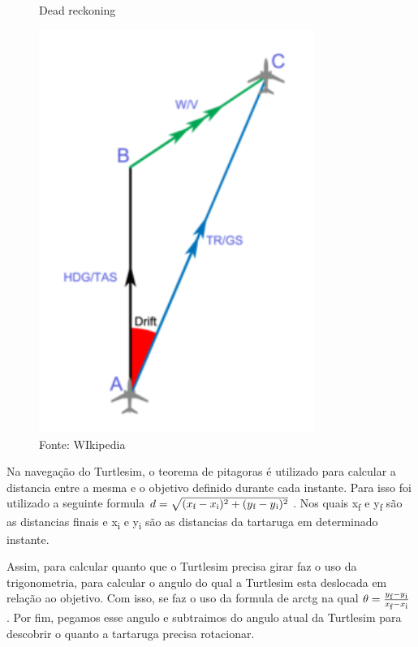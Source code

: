 \begin{figure}[h!]
    \centering
    \caption{Dead reckoning}
    \includegraphics[width=0.8\textwidth]{Figures/dead_reck.png}
    \caption*{Fonte: WIkipedia}
    \label{fig:Dead reckoning}
\end{figure}

Na navegação do Turtlesim, o teorema de pitagoras é utilizado para calcular
a distancia entre a mesma e o objetivo definido durante cada instante. Para 
isso foi utilizado a seguinte formula 
$d = \sqrt{(x\textsubscript{f} - x\textsubscript{i})^2 + (y\textsubscript{f} - y\textsubscript{i})^2}$
. Nos quais x\textsubscript{f} e y\textsubscript{f} são as distancias finais
e x\textsubscript{i} e y\textsubscript{i} são as distancias da tartaruga 
em determinado instante.

Assim, para calcular quanto que o Turtlesim precisa girar faz o uso da 
trigonometria, para calcular o angulo do qual a Turtlesim esta deslocada 
em relação ao objetivo. Com isso, se faz o uso da formula de arctg na qual 
$\theta = \frac{y\textsubscript{f} - y\textsubscript{i}}{x\textsubscript{f} - x\textsubscript{i}} $
. Por fim, pegamos esse angulo e subtraimos do angulo atual da Turtlesim
para descobrir o quanto a tartaruga precisa rotacionar.

